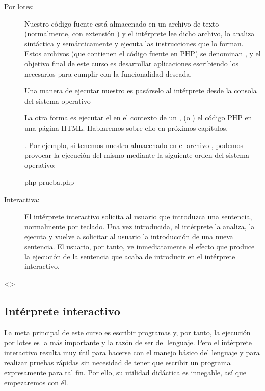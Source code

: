 \documentclass[a4paper,12pt,spanish]{sphinxmanual}
\begin{document}
\ignorespaces \begin{description}
\item[{Por lotes:}] \leavevmode
Nuestro código fuente está almacenado en un archivo de texto (normalmente,
con extensión ) y el intérprete lee dicho archivo, lo analiza
sintáctica y semánticamente y ejecuta las instrucciones que lo forman. Estos
archivos (que contienen el código fuente en PHP) se denominan , y
el objetivo final de este curso es desarrollar aplicaciones escribiendo los
 necesarios para cumplir con la funcionalidad deseada.

Una manera de ejecutar nuestro  es pasárselo al intérprete desde la
consola del sistema operativo %
\begin{footnote}[6]\sphinxAtStartFootnote
La otra forma es ejecutar el  en el contexto de un ,  (o ) el código PHP en una página HTML.
Hablaremos sobre ello en próximos capítulos.
%
\end{footnote}. Por ejemplo, si tenemos nuestro
 almacenado en el archivo , podemos provocar la
ejecución del mismo mediante la siguiente orden del sistema operativo:

\begin{sphinxVerbatim}[commandchars=\\\{\}]
 php prueba.php
\end{sphinxVerbatim}

\item[{Interactiva:}] \leavevmode
El intérprete interactivo solicita al usuario que introduzca una sentencia,
normalmente por teclado. Una vez introducida, el intérprete la analiza, la
ejecuta y vuelve a solicitar al usuario la introducción de una nueva
sentencia. El usuario, por tanto, ve inmediatamente el efecto que produce la
ejecución de la sentencia que acaba de introducir en el intérprete
interactivo.

\end{description}

\textless{}\textgreater{}


\subsection{Intérprete interactivo}
\label{\detokenize{php:interprete-interactivo}}
La meta principal de este curso es escribir programas y, por tanto, la ejecución
por lotes es la más importante y la razón de ser del lenguaje. Pero el
intérprete interactivo resulta muy útil para hacerse con el manejo básico del
lenguaje y para realizar pruebas rápidas sin necesidad de tener que escribir un
programa expresamente para tal fin. Por ello, su utilidad didáctica es
innegable, así que empezaremos con él.
\end{document}
